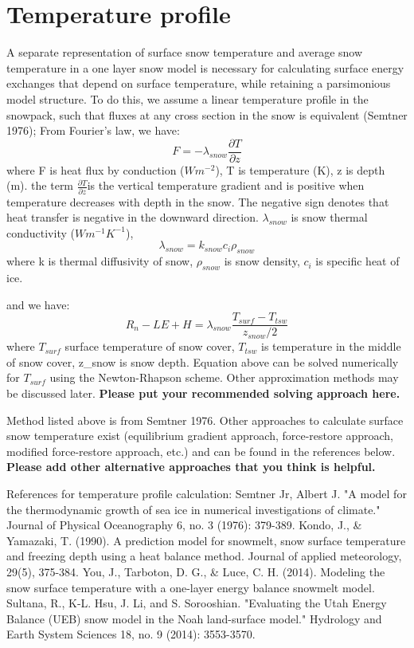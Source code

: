 \documentclass{article}
\begin{document}
\section{Temperature profile}
A separate representation of surface snow temperature and average snow temperature in a one layer snow model is necessary for calculating surface energy exchanges that depend on surface temperature, while retaining a parsimonious model structure. To do this, we assume  a linear temperature profile in the snowpack, such that fluxes at any cross section in the snow is equivalent (Semtner 1976); From Fourier's law, we have:
\begin{equation}
F = -\lambda_{snow}\frac{\partial T}{\partial z}
\end{equation}where F is heat flux by conduction ($Wm^{-2}$), T is temperature (K), z is depth (m). the term $\frac{\partial T}{\partial z}$is the vertical temperature gradient and is positive when temperature decreases with depth in the snow. The negative sign denotes that heat transfer is negative in the downward direction. $\lambda_{snow}$ is snow thermal conductivity ($Wm^{-1}K^{-1}$),
\begin{equation}
\lambda_{snow} = k_{snow} c_i \rho_{snow}
\end{equation}
where k is thermal diffusivity of snow,  $\rho_{snow}$ is snow density, $c_i$ is specific heat of ice.

and we have:
\begin{equation}
R_n - LE + H = \lambda_{snow}\frac{T_{surf}-T_{tsw}}{z_{snow}/2}
\end{equation}where $T_{surf}$ surface temperature of snow cover, $T_{tsw}$ is temperature in the middle of snow cover, z_{snow} is snow depth.
Equation above can be solved numerically for $T_{surf}$ using the Newton-Rhapson scheme. Other approximation methods may be discussed later. \textbf{Please put your recommended solving approach here. }

Method listed above is from Semtner 1976. Other approaches to calculate surface snow temperature exist (equilibrium gradient approach, force-restore approach, modified force-restore approach, etc.) and can be found in the references below. \textbf{Please add other alternative approaches that you think is helpful.}

References for temperature profile calculation:
Semtner Jr, Albert J. "A model for the thermodynamic growth of sea ice in numerical investigations of climate." Journal of Physical Oceanography 6, no. 3 (1976): 379-389.
Kondo, J., & Yamazaki, T. (1990). A prediction model for snowmelt, snow surface temperature and freezing depth using a heat balance method. Journal of applied meteorology, 29(5), 375-384.
You, J., Tarboton, D. G., & Luce, C. H. (2014). Modeling the snow surface temperature with a one-layer energy balance snowmelt model.
Sultana, R., K-L. Hsu, J. Li, and S. Sorooshian. "Evaluating the Utah Energy Balance (UEB) snow model in the Noah land-surface model." Hydrology and Earth System Sciences 18, no. 9 (2014): 3553-3570.
\end{document}
